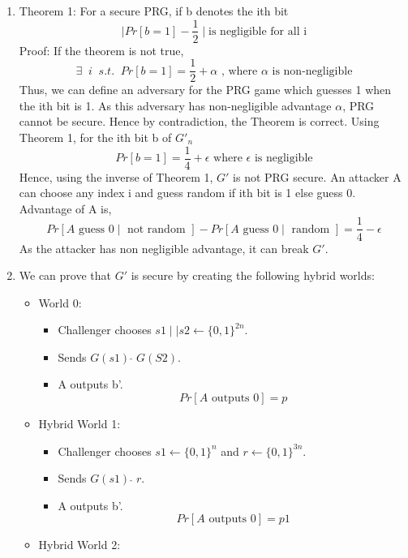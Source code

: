 \documentclass{article}
\begin{document}
\subsubsection{}
\begin{enumerate}[label=\roman*.]
    \item Theorem 1: For a secure PRG, if b denotes the ith bit
\[ \mid Pr[b=1] - \frac{1}{2} \mid \text{is negligible for all i}\]
Proof: If the theorem is not true,
\[ \exists \;\; i \;\; s.t. \;\; Pr[b=1] = \frac{1}{2} +  \alpha\text{ , where }\alpha\text{ is non-negligible}\]
Thus, we can define an adversary for the PRG game which guesses 1 when the ith bit is 1.
As this adversary has non-negligible advantage $\alpha$, PRG cannot be secure.
Hence by contradiction, the Theorem is correct.
    Using Theorem 1, for the ith bit b of $G'_{n}$
    \[Pr[b=1]=\frac{1}{4} + \epsilon \text{ where }\epsilon\text{ is negligible}\]
    Hence, using the inverse of Theorem 1, $G'$ is not PRG secure.
    An attacker A can choose any index i and guess random if ith bit is 1 else guess 0.
    Advantage of A is,
    \[Pr[A\text{ guess } 0\mid \text{ not random }] - Pr[A\text{ guess } 0\mid \text{ random }]= \frac{1}{4}- \epsilon\]
    As the attacker has non negligible advantage, it can break $G'$.
    \item We can prove that $G'$ is secure by creating the following hybrid worlds:
    \begin{itemize}
        \item World 0: 
        \begin{itemize}
            \item Challenger chooses $s1 \mid \mid s2\leftarrow\{0,1\}^{2n}$.
            \item Sends $G(s1)\; \widehat{}\; G(S2)$.
            \item A outputs b'.
            \[Pr[A \text{ outputs }0]=p\]
        \end{itemize}
        \item Hybrid World 1:
        \begin{itemize}
            \item Challenger chooses $s1\leftarrow\{0,1\}^{n}$ and $r\leftarrow\{0,1\}^{3n}$.
            \item Sends $G(s1)\; \widehat{}\; r$.
            \item A outputs b'.
            \[Pr[A \text{ outputs }0]=p1\]
        \end{itemize}
        \item Hybrid World 2:
        \begin{itemize}

\end{itemize}
\end{itemize}
\end{enumerate}
\end{document}
